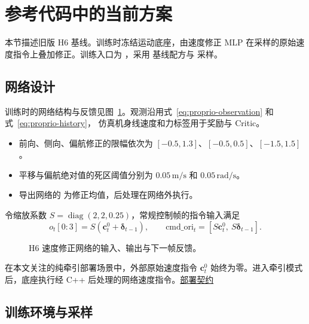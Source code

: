 \section{参考代码中的当前方案}
\label{sec:h6-baseline}

本节描述旧版 H6 基线。训练时冻结运动底座，由速度修正 MLP 在采样的原始速度指令上叠加修正。训练入口为 ，采用  基线配方与  采样。

\subsection{网络设计}

训练时的网络结构与反馈见图~\ref{fig:h6-network-feedback}。观测沿用式~\eqref{eq:proprio-observation} 和式~\eqref{eq:proprio-history}，
仿真机身线速度和力标签用于奖励与 Critic。

\begin{itemize}
  \item 前向、侧向、偏航修正的限幅依次为 $[-0.5,1.3]$、$[-0.5,0.5]$、$[-1.5,1.5]$。
  \item 平移与偏航绝对值的死区阈值分别为 $0.05\,\mathrm{m/s}$ 和 $0.05\,\mathrm{rad/s}$。
  \item 导出网络的  为修正均值，后处理在网络外执行。
\end{itemize}

令缩放系数 $S=\operatorname{diag}(2,2,0.25)$，常规控制帧的指令输入满足
\begin{equation}
 o_t[0{:}3]=S(\bm c^0_t+\bm\delta_{t-1}),\qquad
 \mathrm{cmd\_ori}_t=[S\bm c^0_t,\ S\bm\delta_{t-1}].
\label{eq:redundant}
\end{equation}

\begin{figure}[!htbp]
\centering

\caption{H6 速度修正网络的输入、输出与下一帧反馈。}
\label{fig:h6-network-feedback}
\end{figure}

在本文关注的纯牵引部署场景中，外部原始速度指令 $\bm c_t^0$ 始终为零。进入牵引模式后，底座执行经 C++ 后处理的网络速度指令。\href{https://github.com/VitaDynamics/cerebrix/blob/57a05ee00d229da6fd6f10defcc51e947247d6c6/source/cerebrix/cerebrix/rl/traction/contracts/deployment_h6_v2/deployment_contract.json\#L57}{部署契约}

\clearpage
\subsection{训练环境与采样}

